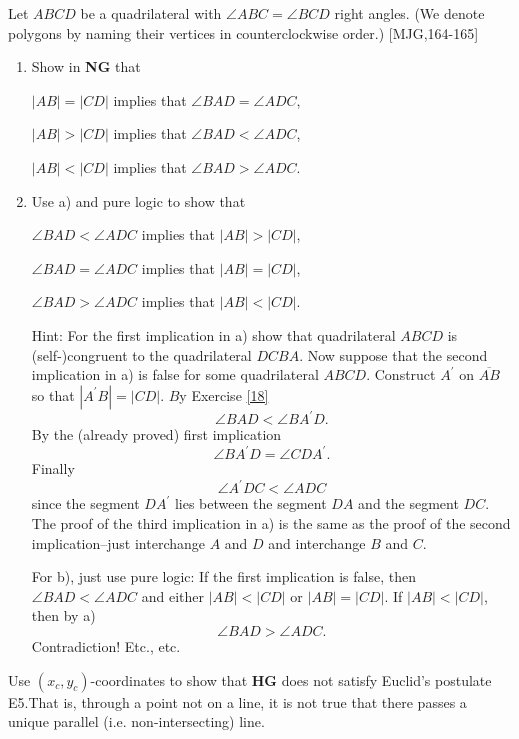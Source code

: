 \documentclass{ximera}
\begin{document}
\begin{exercise}
Let $ABCD$ be a quadrilateral with $\angle ABC=\angle BCD$
right angles. (We denote polygons by naming their vertices in counterclockwise
order.) [MJG,164-165]
\begin{enumerate}
\item Show in \textbf{NG} that

$\left\vert AB\right\vert =\left\vert CD\right\vert $ implies that $\angle
BAD=\angle ADC$,

$\left\vert AB\right\vert >\left\vert CD\right\vert $ implies that $\angle
BAD<\angle ADC$,

$\left\vert AB\right\vert <\left\vert CD\right\vert $ implies that $\angle
BAD>\angle ADC$.

\item Use a) and pure logic to show that

$\angle BAD<\angle ADC$ implies that $\left\vert AB\right\vert >\left\vert
CD\right\vert $,

$\angle BAD=\angle ADC$ implies that $\left\vert AB\right\vert =\left\vert
CD\right\vert $,

$\angle BAD>\angle ADC$ implies that $\left\vert AB\right\vert <\left\vert
CD\right\vert $.

Hint: For the first implication in a) show that quadrilateral $ABCD$ is
(self-)congruent to the quadrilateral $DCBA$. Now suppose that the second
implication in a) is false for some quadrilateral $ABCD$. Construct
$A^{\prime}$ on $\overline{AB}$ so that $\left\vert A^{\prime}B\right\vert
=\left\vert CD\right\vert $. $B$y Exercise \ref{18}%
\[
\angle BAD<\angle BA^{\prime}D.
\]
By the (already proved) first implication%
\[
\angle BA^{\prime}D=\angle CDA^{\prime}.
\]
Finally%
\[
\angle A^{\prime}DC<\angle ADC
\]
since the segment $DA^{\prime}$ lies between the segment $DA$ and the segment
$DC$. The proof of the third implication in a) is the same as the proof of
the second implication--just interchange $A$ and $D$ and interchange $B$ and
$C$.

For b), just use pure logic: If the first implication is false, then $\angle
BAD<\angle ADC$ and either $\left\vert AB\right\vert <\left\vert CD\right\vert
$ or $\left\vert AB\right\vert =\left\vert CD\right\vert $. If $\left\vert
AB\right\vert <\left\vert CD\right\vert $, then by a)%
\[
\angle BAD>\angle ADC.
\]
Contradiction! Etc., etc.
\end{enumerate}
\end{exercise}

\begin{exercise}
Use $\left(  x_{c},y_{c}\right)  $-coordinates to show that \textbf{HG} does
not satisfy Euclid's postulate E5.That is, through a point not on a line, it
is not true that there passes a unique parallel (i.e. non-intersecting) line.
\end{exercise}
\end{document}
